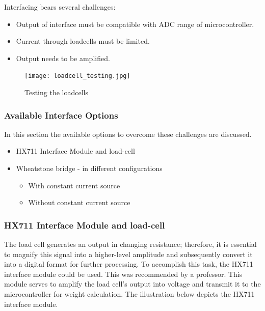 \documentclass[../report.tex]{subfiles}
\begin{document}
Interfacing bears several challenges:

\begin{itemize}

  \item Output of interface must be compatible with ADC range of microcontroller.
  \item Current through loadcells must be limited.
  \item Output needs to be amplified.

\end{itemize}
\begin{figure}[H]
  \centering
  \texttt{[image: loadcell\_testing.jpg]}
  \caption{Testing the loadcells}
\end{figure} 
\subsubsection{Available Interface Options}

In this section the available options to overcome these challenges are discussed.

\begin{itemize}
  
  \item HX711 Interface Module and load-cell
  \item Wheatstone bridge - in different configurations
  \begin{itemize}
    \item With constant current source
    \item Without constant current source
  \end{itemize}
  
\end{itemize}

\subsubsection{HX711 Interface Module and load-cell}

The load cell generates an output in changing resistance; therefore, it is essential to magnify 
this signal into a higher-level amplitude and subsequently convert it into a digital format for further processing.
To accomplish this task, the HX711 interface module could be used. This was recommended by a professor. 
This module serves to amplify the load cell's output into voltage and transmit it to the microcontroller for weight calculation. 
The illustration below depicts the HX711 interface module.
\end{document}
